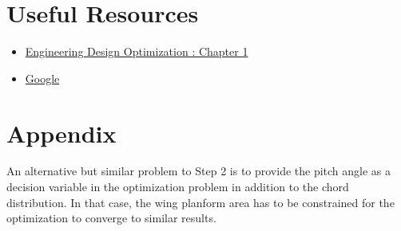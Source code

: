 \documentclass[12pt]{article}
\begin{document}

\section{Useful Resources}
\begin{itemize}
	\item \href{http://flowlab.groups.et.byu.net/mdobook.pdf}{Engineering Design Optimization : Chapter 1}
	\item \href{https://www.google.com/}{Google}
\end{itemize}

\section{Appendix}
An alternative but similar problem to Step 2 is to provide the pitch angle as a decision variable in the optimization problem in addition to the chord distribution. In that case, the wing planform area has to be constrained for the optimization to converge to similar results.
\end{document}
